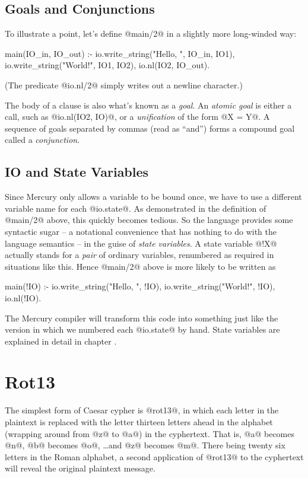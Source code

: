 \subsection{Goals and Conjunctions}

To illustrate a point, let's define @main/2@ in a slightly more
long-winded way:
\begin{myverbatim}
main(IO_in, IO_out) :-
    io.write_string("Hello, ", IO_in, IO1),
    io.write_string("World!",  IO1, IO2),
    io.nl(IO2, IO_out).
\end{myverbatim}
(The predicate @io.nl/2@ simply writes out a newline character.)

The body of a clause is also what's known as a \emph{goal}.  An \emph{atomic
goal} is either a call, such as @io.nl(IO2, IO)@, or a \emph{unification} of
the form @X = Y@.  A sequence of goals separated by commas (read as ``and'')
forms a compound goal called a \emph{conjunction}.

\subsection{IO and State Variables}

Since Mercury only allows a variable to be bound once, we have to use a
different variable name for each @io.state@.  As demonstrated in the
definition of @main/2@ above, this quickly becomes tedious.  So the language
provides some syntactic sugar -- a notational convenience that has nothing
to do with the language semantics -- in the guise of \emph{state variables}.
A state variable @!X@ actually stands for a \emph{pair} of ordinary
variables, renumbered as required in situations like this.  Hence 
@main/2@ above is more likely to be written as
\begin{myverbatim}
main(!IO) :-
    io.write_string("Hello, ", !IO),
    io.write_string("World!",  !IO),
    io.nl(!IO).
\end{myverbatim}
The Mercury compiler will transform this code into something just like the
version in which we numbered each @io.state@ by hand.  State variables are
explained in detail in chapter \XXX{}.



\section{Rot13}

The simplest form of Caesar cypher is @rot13@, in which each letter in the
plaintext is replaced with the letter thirteen letters ahead in the alphabet
(wrapping around from @z@ to @a@) in the cyphertext.  That is, @a@ becomes
@n@, @b@ becomes @o@, \ldots and @z@ becomes @m@.  There being twenty six
letters in the Roman alphabet, a second application of @rot13@ to the
cyphertext will reveal the original plaintext message.

